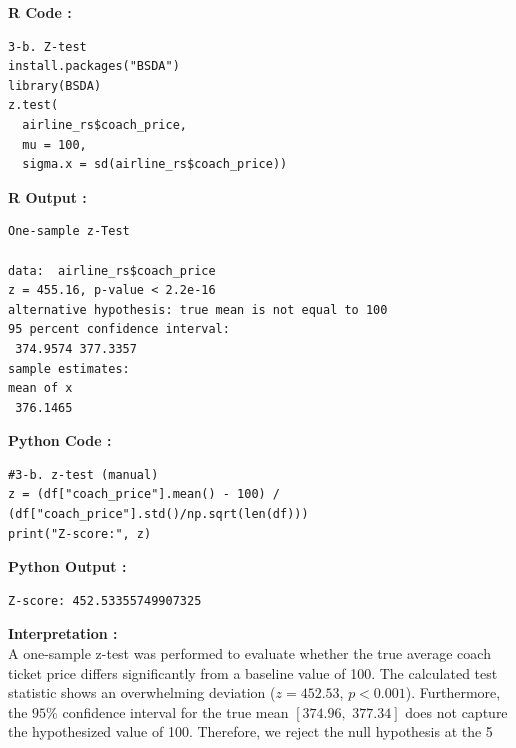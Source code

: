 \documentclass[11pt,a4paper]{article}
\begin{document}
\noindent \textbf{R Code :}
\begin{codebox}
\begin{lstlisting}[style=Rstyle]
3-b. Z-test
install.packages("BSDA")
library(BSDA)
z.test(
  airline_rs$coach_price,
  mu = 100,
  sigma.x = sd(airline_rs$coach_price))
\end{lstlisting}
\end{codebox}

\vspace{0.5em}
\noindent \textbf{R Output :}
\begin{verbatim}
One-sample z-Test

data:  airline_rs$coach_price
z = 455.16, p-value < 2.2e-16
alternative hypothesis: true mean is not equal to 100
95 percent confidence interval:
 374.9574 377.3357
sample estimates:
mean of x 
 376.1465 

\end{verbatim}

\vspace{0.5em}
\noindent \textbf{Python Code :}
\begin{codebox}
\begin{lstlisting}[style=Pythonstyle]
#3-b. z-test (manual)
z = (df["coach_price"].mean() - 100) / (df["coach_price"].std()/np.sqrt(len(df)))
print("Z-score:", z)
\end{lstlisting}
\end{codebox}

\vspace{0.5em}
\noindent \textbf{Python Output :}

\begin{verbatim}
Z-score: 452.53355749907325
\end{verbatim}
\vspace{0.5em}
\noindent \textbf{Interpretation :} \\
A one-sample z-test was performed to evaluate whether the true average coach ticket price differs significantly from a baseline value of 100. The calculated test statistic shows an overwhelming deviation ($z = 452.53$, $p < 0.001$). Furthermore, the $95\%$ confidence interval for the true mean $[374.96, \,\, 377.34]$ does not capture the hypothesized value of 100. Therefore, we reject the null hypothesis at the 5%
\vspace{2.5em}
\end{document}
